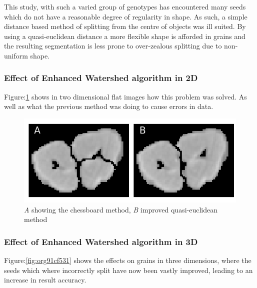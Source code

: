\documentclass[11pt]{report}
\begin{document}
This study, with such a varied group of genotypes has encountered many seeds which do not have a reasonable degree of regularity in shape. As such, a simple distance based method of splitting from the centre of objects was ill suited. By using a quasi-euclidean distance a more flexible shape is afforded in grains and the resulting segmentation is less prone to over-zealous splitting due to non-uniform shape.

\subsubsection{Effect of Enhanced Watershed algorithm in 2D}
\label{sec:orge728067}

Figure:\ref{fig:orgc23eebf} shows in two dimensional flat images how this problem was solved. As well as what the previous method was doing to cause errors in data.
\begin{figure}[htbp]
\centering
\includegraphics[width=16cm]{./images/chess_quasi.png}
\caption{\label{fig:orgc23eebf}
\emph{A} showing the chessboard method, \emph{B} improved quasi-euclidean method}
\end{figure}

\clearpage
\subsubsection{Effect of Enhanced Watershed algorithm in 3D}
\label{sec:org431b079}

Figure:\ref{fig:org91cf531} shows the effects on grains in three dimensions, where the seeds which where incorrectly split have now been vastly improved, leading to an increase in result accuracy.
\end{document}
